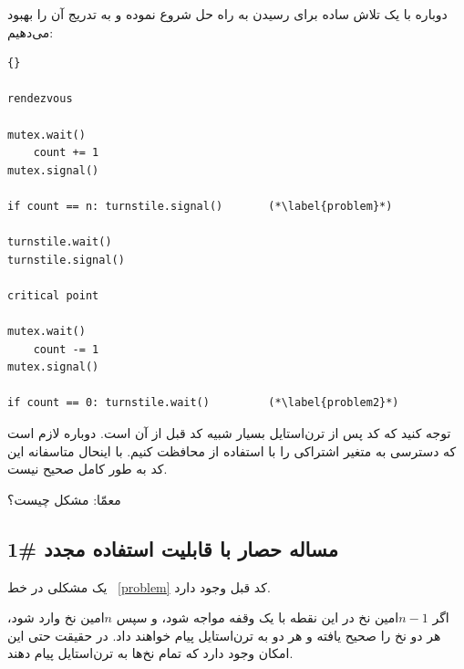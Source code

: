 \documentclass{book}
\newcommand{\clearemptydoublepage}{\newpage\cleardoublepage}
\begin{document}
    دوباره با یک تلاش ساده برای رسیدن به راه حل شروع نموده و به تدریج آن را بهبود می‌دهیم:

\begin{latin}
\begin{latin}
\begin{lstlisting}[title=\rl{{  نا راه حل حصار با قابلیت استفاده مجدد}}]{} 

rendezvous

mutex.wait()
    count += 1
mutex.signal()

if count == n: turnstile.signal()       (*\label{problem}*)

turnstile.wait()
turnstile.signal()

critical point

mutex.wait()
    count -= 1
mutex.signal()

if count == 0: turnstile.wait()         (*\label{problem2}*)
\end{lstlisting}
\end{latin}
\end{latin}

    توجه کنید که کد پس از تر‌ن‌استایل بسیار شبیه کد قبل از آن است. دوباره لازم است که دسترسی به متغیر اشتراکی  را 
    با استفاده از  محافظت کنیم. با اینحال متاسفانه این کد به طور کامل صحیح نیست. 

    معمّا: مشکل چیست؟


\clearemptydoublepage
\subsection 
{ مساله حصار با قابلیت استفاده مجدد  \#1}

    یک مشکلی در خط ~\ref{problem} کد قبل وجود دارد. 

    اگر $n-1$امین نخ در این نقطه با یک وقفه مواجه شود، و سپس $n$امین نخ وارد  شود، هر دو نخ  
    را صحیح یافته و هر دو به ترن‌استایل پیام خواهند داد. در حقیقت حتی این امکان وجود دارد که تمام نخ‌ها به ترن‌استایل پیام دهند. 
\end{document}
